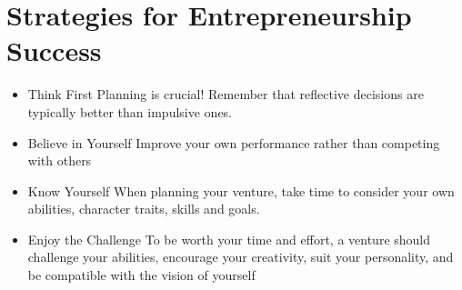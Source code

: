 \documentclass[11pt]{article}
\begin{document}
\section{Strategies for Entrepreneurship Success}
\label{sec:orgb1ae454}
\begin{itemize}
\item Think First
Planning is crucial! Remember that reflective decisions are typically better than impulsive ones.
\item Believe in Yourself
Improve your own performance rather than competing with others
\item Know Yourself
When planning your venture, take time to consider your own abilities, character traits, skills and goals.
\item Enjoy the Challenge
To be worth your time and effort, a venture should challenge your abilities, encourage your creativity, suit your personality, and be compatible with the vision of yourself
\end{itemize}
\end{document}
